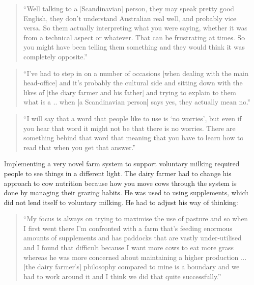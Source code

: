\begin{quote}
\small
\enquote{Well talking to a [Scandinavian] person, they may speak pretty good English, they don't understand Australian real well, and probably vice versa. So them actually interpreting what you were saying, whether it was from a technical aspect or whatever. That can be frustrating at times. So you might have been telling them something and they would think it was completely opposite.} \\
\end{quote}

\begin{quote}
\small
\enquote{I've had to step in on a number of occasions [when dealing with the main head-office] and it's probably the cultural side and sitting down with the likes of [the diary farmer and his father] and trying to explain to them what is a .. when [a Scandinavian person] says yes, they actually mean no.} \\
\end{quote}

\begin{quote}
\small
\enquote{I will say that a word that people like to use is \enquote{no worries}, but even if you hear that word it might not be that there is no worries.  There are something behind that word that meaning that you have to learn how to read that when you get that answer.} \\
\end{quote}

Implementing a very novel farm system to support voluntary milking required people to see things in a  different light. The dairy farmer had to change his approach to cow nutrition because how you move cows through the system is done by managing their grazing habits. He was used to using supplements, which did not lend itself to voluntary milking. He had to adjust his way of thinking:

\begin{quote}
\small
\enquote{My focus is always on trying to maximise the use of pasture and so when I first went there I'm confronted with a farm that's feeding enormous amounts of supplements and has paddocks that are vastly under-utilised and I found that difficult because I want more cows to eat more grass whereas he was more concerned about maintaining a higher production ... [the dairy farmer's] philosophy compared to mine is a boundary and we had to work around it and I think we did that quite successfully.} \\
\end{quote}

